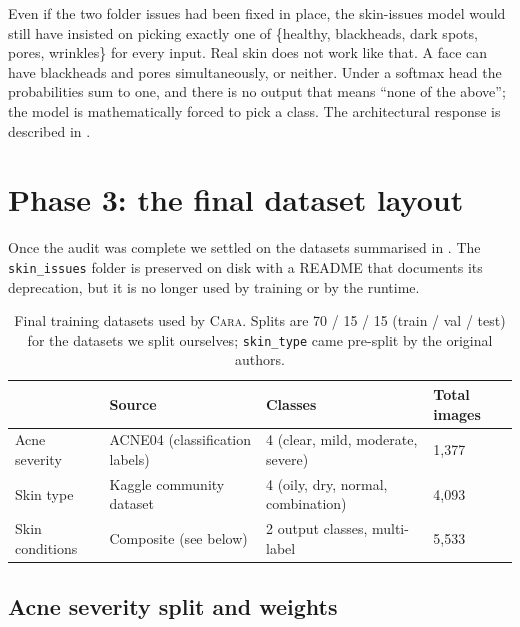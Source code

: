 \documentclass[11pt,a4paper,oneside]{report}
\newcommand{\cara}{\textsc{Cara}\xspace}
\begin{document}
Even if the two folder issues had been fixed in place, the
skin-issues model would still have insisted on picking exactly one
of \{healthy, blackheads, dark spots, pores, wrinkles\} for every
input. Real skin does not work like that. A face can have
blackheads and pores simultaneously, or neither. Under a softmax
head the probabilities sum to one, and there is no output that
means ``none of the above''; the model is mathematically forced
to pick a class. The architectural response is described in
.

\section{Phase 3: the final dataset layout}

Once the audit was complete we settled on the datasets summarised in
. The \texttt{skin\_issues} folder is
preserved on disk with a README that documents its deprecation, but
it is no longer used by training or by the runtime.

\begin{table}[htbp]
    \centering
    \caption{Final training datasets used by \cara.
    Splits are 70 / 15 / 15 (train / val / test) for the datasets we
    split ourselves; \texttt{skin\_type} came pre-split by the
    original authors.}
    \label{tab:final-datasets}
    \small
    \begin{tabularx}{\linewidth}{lXXX}
        \toprule
        & \textbf{Source} & \textbf{Classes} & \textbf{Total images} \\
        \midrule
        Acne severity     & ACNE04 (classification labels) & 4 (clear, mild, moderate, severe) & 1{,}377 \\
        Skin type         & Kaggle community dataset       & 4 (oily, dry, normal, combination) & 4{,}093 \\
        Skin conditions   & Composite (see below)          & 2 output classes, multi-label      & 5{,}533 \\
        \bottomrule
    \end{tabularx}
\end{table}

\subsection{Acne severity split and weights}
\end{document}
